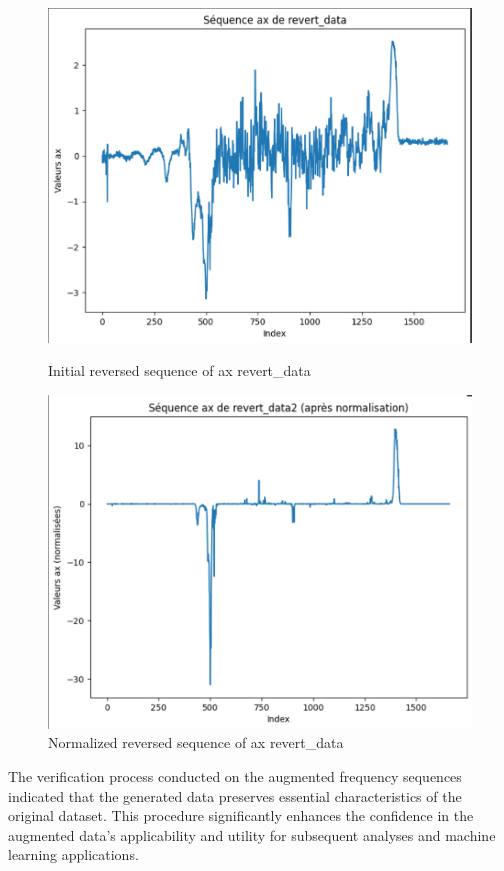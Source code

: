 \begin{figure}[H]
    \begin{adjustbox}{minipage=0.4\textwidth}
    \includegraphics[scale=0.6]{img/reversed_data_ax.png}
    \caption{Initial reversed sequence of ax revert\_data}
    \label{reversed_data_ax}
    \end{adjustbox}
    \hspace*{0.1\textwidth}
    \begin{adjustbox}{minipage=0.4\textwidth}
    \includegraphics[scale=0.6]{img/reversed_data_ax_norm.png}
    \caption{Normalized reversed sequence of ax revert\_data}
  \label{reversed_data_ax_norm}
    \end{adjustbox}
\end{figure}

\noindent The verification process conducted on the augmented frequency sequences indicated that the generated data preserves essential characteristics of the original dataset. This procedure significantly enhances the confidence in the augmented data's applicability and utility for subsequent analyses and machine learning applications.\\